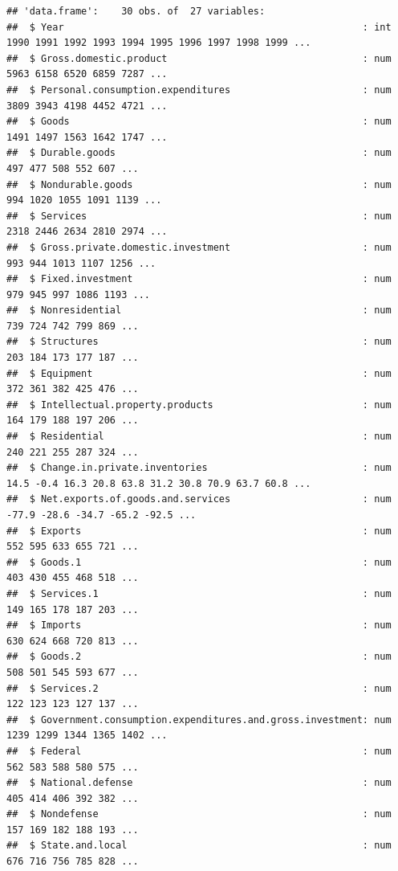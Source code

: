 \documentclass[12pt,]{article}
\begin{document}
\begin{verbatim}
## 'data.frame':    30 obs. of  27 variables:
##  $ Year                                                    : int  1990 1991 1992 1993 1994 1995 1996 1997 1998 1999 ...
##  $ Gross.domestic.product                                  : num  5963 6158 6520 6859 7287 ...
##  $ Personal.consumption.expenditures                       : num  3809 3943 4198 4452 4721 ...
##  $ Goods                                                   : num  1491 1497 1563 1642 1747 ...
##  $ Durable.goods                                           : num  497 477 508 552 607 ...
##  $ Nondurable.goods                                        : num  994 1020 1055 1091 1139 ...
##  $ Services                                                : num  2318 2446 2634 2810 2974 ...
##  $ Gross.private.domestic.investment                       : num  993 944 1013 1107 1256 ...
##  $ Fixed.investment                                        : num  979 945 997 1086 1193 ...
##  $ Nonresidential                                          : num  739 724 742 799 869 ...
##  $ Structures                                              : num  203 184 173 177 187 ...
##  $ Equipment                                               : num  372 361 382 425 476 ...
##  $ Intellectual.property.products                          : num  164 179 188 197 206 ...
##  $ Residential                                             : num  240 221 255 287 324 ...
##  $ Change.in.private.inventories                           : num  14.5 -0.4 16.3 20.8 63.8 31.2 30.8 70.9 63.7 60.8 ...
##  $ Net.exports.of.goods.and.services                       : num  -77.9 -28.6 -34.7 -65.2 -92.5 ...
##  $ Exports                                                 : num  552 595 633 655 721 ...
##  $ Goods.1                                                 : num  403 430 455 468 518 ...
##  $ Services.1                                              : num  149 165 178 187 203 ...
##  $ Imports                                                 : num  630 624 668 720 813 ...
##  $ Goods.2                                                 : num  508 501 545 593 677 ...
##  $ Services.2                                              : num  122 123 123 127 137 ...
##  $ Government.consumption.expenditures.and.gross.investment: num  1239 1299 1344 1365 1402 ...
##  $ Federal                                                 : num  562 583 588 580 575 ...
##  $ National.defense                                        : num  405 414 406 392 382 ...
##  $ Nondefense                                              : num  157 169 182 188 193 ...
##  $ State.and.local                                         : num  676 716 756 785 828 ...
\end{verbatim}
\end{document}
